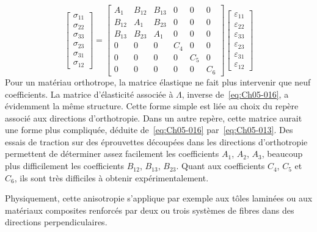 \begin{equation}
    \begin{bmatrix}
        \sigma_{11}\\
        \sigma_{22}\\
        \sigma_{33}\\
        \sigma_{23}\\
        \sigma_{31}\\
        \sigma_{12}
    \end{bmatrix}
    =
    \begin{bmatrix}
        A_{1} & B_{12} & B_{13} & 0 & 0 & 0 \\
        B_{12} & A_{1} & B_{23} & 0 & 0 & 0 \\
        B_{13} & B_{23} & A_1 & 0 & 0 & 0 \\
        0 & 0 & 0 & C_{4} & 0 & 0 \\
        0 & 0 & 0 & 0 & C_{5} & 0 \\
        0 & 0 & 0 & 0 & 0 & C_{6}
    \end{bmatrix}
    \begin{bmatrix}
        \varepsilon_{11}\\
        \varepsilon_{22}\\
        \varepsilon_{33}\\
        \varepsilon_{23}\\
        \varepsilon_{31}\\
        \varepsilon_{12}
    \end{bmatrix}
    \label{eq:Ch05-016}
\end{equation}
Pour un matériau orthotrope, la matrice élastique ne fait plus intervenir que neuf coefficients.
La matrice d'élasticité associée à $\Lambda$, inverse de~\eqref{eq:Ch05-016}, a évidemment la même structure.
Cette forme simple est liée au choix du repère associé aux directions d'orthotropie.
Dans un autre repère, cette matrice aurait une forme plus compliquée, déduite de~\eqref{eq:Ch05-016} par~\eqref{eq:Ch05-013}.
Des essais de traction sur des éprouvettes découpées dans les directions d'orthotropie permettent de déterminer assez facilement les coefficients $A_1$, $A_2$, $A_3$, beaucoup plus difficilement les coefficients $B_{12}$, $B_{13}$, $B_{23}$. 
Quant aux coefficients $C_4$, $C_5$ et $C_6$, ils sont très difficiles à obtenir expérimentalement.

Physiquement, cette anisotropie s'applique par exemple aux tôles laminées ou aux matériaux composites renforcés par deux ou trois systèmes de fibres dans des directions perpendiculaires.

